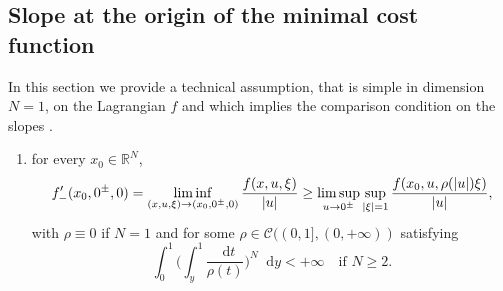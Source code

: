 \documentclass[10pt]{amsart}
\theoremstyle{plain}
\theoremstyle{definition}
\newcommand{\dd}{\mathop{}\mathopen{}\mathrm{d}}
\newcommand{\R}{\mathbb{R}}
\newcommand{\Cspace}{\mathscr{C}}
\DeclarePairedDelimiter{\abs}{\lvert}{\rvert}
\begin{document}
\subsection{Slope at the origin of the minimal cost function}\label{sectionSlopeOrigin}

In this section we provide a technical assumption, that is simple in dimension $N=1$, on the Lagrangian $f$ and which implies the comparison condition on the slopes .

\begin{enumerate}[\textnormal{(S)},leftmargin=1.5\normalparindent]
\item\label{hypSlopeLagrangian} for every $x_0\in \R^N$,
\begin{equation}\label{slopeInf}
f'_-(x_0,0^\pm,0) = \displaystyle\liminf_{(x,u,\xi) \to (x_0,0^\pm,0)} \frac{f(x,u,\xi)}{\abs{u}} \geq
\limsup_{u\to 0^\pm}\sup_{\abs{\xi}= 1}\frac{f(x_0,u,\rho(\abs{u})\xi)}{\abs{u}},
\end{equation}
with \(\rho\equiv 0\) if \(N=1\) and for some \(\rho\in\Cspace((0,1],(0,+\infty))\) satisfying
\[
\int_0^1\Big(\int_y^1\frac{\dd t}{\rho(t)}\Big)^N\dd y<+\infty\quad\text{if \(N\geq 2\)}.
\]
\end{enumerate}
\end{document}
